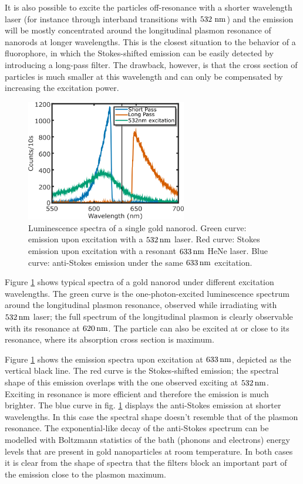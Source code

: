 It is also possible to excite the particles off-resonance with a shorter
wavelength laser (for instance through interband transitions with $532\,\,\textrm{nm}$)
and the emission will be mostly concentrated around the longitudinal plasmon
resonance of nanorods at longer wavelengths. This is the closest situation to
the behavior of a fluorophore, in which the Stokes-shifted emission can be
easily detected by introducing a long-pass filter. The drawback, however, is
that the cross section of particles is much smaller at this wavelength and can
only be compensated by increasing the excitation power.

\begin{figure}[tp] \centering
\includegraphics[width=7.0cm]{Chapters/03_Background_Free/Figures/01_3_Curves/3_curves_final.png}
\caption{Luminescence spectra of a single gold nanorod. Green curve: emission
upon excitation with a $532\,\textrm{nm}$ laser. Red curve: Stokes emission upon
excitation with a resonant $633\,\textrm{nm}$ HeNe laser. Blue curve: anti-Stokes emission
under the same $633\,\textrm{nm}$ excitation.}
	\label{fig:spectra_rod}
\end{figure}

Figure \ref{fig:spectra_rod} shows typical spectra of a gold nanorod under
different excitation wavelengths. The green curve is the one-photon-excited
luminescence spectrum around the longitudinal plasmon resonance, observed while
irradiating with $532\,\textrm{nm}$ laser; the full spectrum of the longitudinal plasmon
is clearly observable with its resonance at $620\,\textrm{nm}$. The particle can also be
excited at or close to its resonance, where its absorption cross section is
maximum. 

Figure \ref{fig:spectra_rod} shows the emission spectra upon excitation at
$633\,\textrm{nm}$, depicted as the vertical black line. The red curve is the
Stokes-shifted emission; the spectral shape of this emission overlaps with the
one observed exciting at $532\,\textrm{nm}$. Exciting in resonance is more efficient and
therefore the emission is much brighter. The blue curve in fig.
\ref{fig:spectra_rod} displays the anti-Stokes emission at shorter wavelengths.
In this case the spectral shape doesn't resemble that of the plasmon resonance.
The exponential-like decay of the anti-Stokes spectrum can be modelled with
Boltzmann statistics\cite{He2015} of the bath (phonons and electrons) energy
levels that are present in gold nanoparticles at room temperature. In both cases
it is clear from the shape of spectra that the filters block an important part of the
emission close to the plasmon maximum.
 
